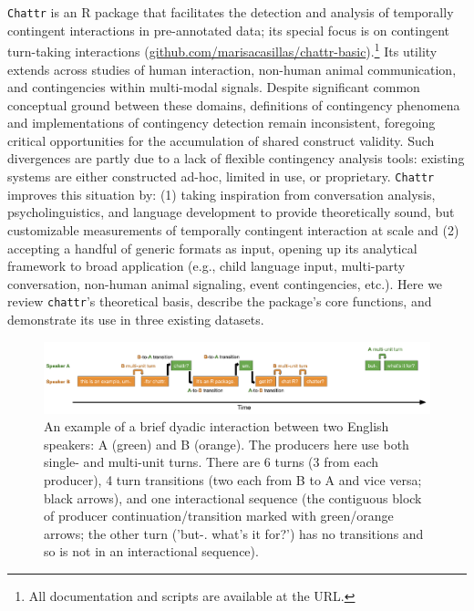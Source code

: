 \documentclass[10pt, letterpaper]{article}
\newenvironment{CodeChunk}{}{}
\begin{document}
\texttt{Chattr} is an R package that facilitates the detection and
analysis of temporally contingent interactions in pre-annotated data;
its special focus is on contingent turn-taking interactions
(\href{https://github.com/marisacasillas/chattr-basic}{github.com/marisacasillas/chattr-basic}).\footnote{All
  documentation and scripts are available at the URL.} Its utility
extends across studies of human interaction, non-human animal
communication, and contingencies within multi-modal signals. Despite
significant common conceptual ground between these domains, definitions
of contingency phenomena and implementations of contingency detection
remain inconsistent, foregoing critical opportunities for the
accumulation of shared construct validity. Such divergences are partly
due to a lack of flexible contingency analysis tools: existing systems
are either constructed ad-hoc, limited in use, or proprietary.
\texttt{Chattr} improves this situation by: (1) taking inspiration from
conversation analysis, psycholinguistics, and language development to
provide theoretically sound, but customizable measurements of temporally
contingent interaction at scale and (2) accepting a handful of generic
formats as input, opening up its analytical framework to broad
application (e.g., child language input, multi-party conversation,
non-human animal signaling, event contingencies, etc.). Here we review
\texttt{chattr}'s theoretical basis, describe the package's core
functions, and demonstrate its use in three existing datasets.

\begin{CodeChunk}
\begin{figure}[h]

{\centering \includegraphics{figs/minisequence-1} 

}

\caption[An example of a brief dyadic interaction between two English speakers]{An example of a brief dyadic interaction between two English speakers: A (green) and B (orange). The producers here use both single- and multi-unit turns. There are 6 turns (3 from each producer), 4 turn transitions (two each from B to A and vice versa; black arrows), and one interactional sequence (the contiguous block of producer continuation/transition marked with green/orange arrows; the other turn ('but-. what's it for?') has no transitions and so is not in an interactional sequence).}\label{fig:minisequence}
\end{figure}
\end{CodeChunk}
\end{document}
